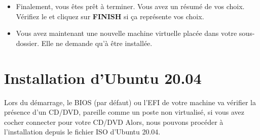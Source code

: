 \begin{itemize}
		
		\item Finalement, vous êtes {\color{blue}prêt à terminer}. Vous avez un résumé de vos choix. Vérifiez le et cliquez sur \textbf{FINISH} si ça représente vos choix.
		\item Vous avez maintenant une nouvelle machine virtuelle placée dans votre sous-dossier. Elle ne demande qu'à être installée. {\color{orange}{\Huge \smiley{}}}
	\end{itemize}
	
	
	
	
	
	
	
	
	
	
	
	
	
	
	\section{Installation d'Ubuntu 20.04} 
	Lors du démarrage, le BIOS (par défaut) ou l'EFI de votre machine va vérifier la présence d'un CD/DVD, pareille comme un poste non virtualisé, si vous avez cocher connecter pour votre CD/DVD  Alors, nous pouvons procéder à l'installation depuis le fichier ISO d'Ubuntu 20.04.
	
